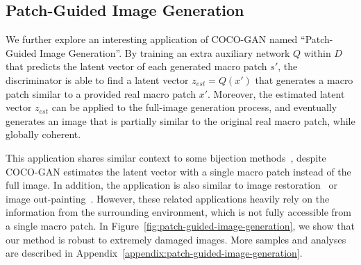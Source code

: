 \documentclass{article}
\newcommand{\modelName}{COCO-GAN }
\begin{document}
    \subsection{Patch-Guided Image Generation}
        
        We further explore an interesting application of \modelName named ``Patch-Guided Image Generation''. By training an extra auxiliary network $Q$ within $D$ that predicts the latent vector of each generated macro patch $s'$, the discriminator is able to find a latent vector $z_{\textit{est}} = Q(x')$ that generates a macro patch similar to a provided real macro patch $x'$. Moreover, the estimated latent vector $z_{\textit{est}}$ can be applied to the full-image generation process, and eventually generates an image that is partially similar to the original real macro patch, while globally coherent. 
        
        This application shares similar context to some bijection methods~\cite{ali,bigan,BEGAN-CS}, despite \modelName estimates the latent vector with a single macro patch instead of the full image. In addition, the application is also similar to image restoration~\cite{partial-conv,inpaintingC,inpaintingB} or image out-painting~\cite{out-painting}. However, these related applications heavily rely on the information from the surrounding environment, which is not fully accessible from a single macro patch. In Figure~\ref{fig:patch-guided-image-generation}, we show that our method is robust to extremely damaged images. More samples and analyses are described in Appendix~\ref{appendix:patch-guided-image-generation}.
        
\end{document}
